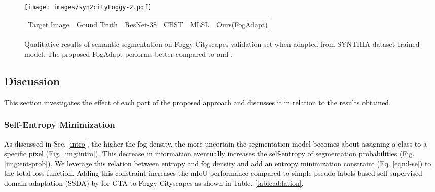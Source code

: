 \documentclass[final,5p,times,twocolumn]{elsarticle}
\begin{document}
\begin{figure*}[t]
	\centering
\texttt{[image: images/syn2cityFoggy-2.pdf]}\\
	\footnotesize
	\begin{tabular}{P{1.5cm}P{1.45cm}P{1.8cm}P{1.5cm}P{1.45cm}P{1.4cm}}
    Target Image & Gound Truth & ResNet-38 \cite{wu2019Resnet38} &CBST \cite{zou2018unsupervised} & MLSL \cite{mlsl2020} & Ours(FogAdapt)
    \end{tabular}
    \caption{Qualitative results of semantic segmentation on Foggy-Cityscapes validation set when adapted from SYNTHIA dataset trained model. The proposed FogAdapt performs better compared to \cite{zou2018unsupervised} and \cite{mlsl2020}.}
\label{img:syn2cityFoggy}
\end{figure*}
\subsection{Discussion}
\textcolor{black}{This section investigates the effect of each part of the proposed approach and discusses it in relation to the results obtained.}

\subsubsection{Self-Entropy Minimization}
\textcolor{black}{
As discussed in Sec. \ref{intro}, the higher the fog density, the more uncertain the segmentation model becomes about assigning a class to a specific pixel (Fig. \ref{img:intro}). This decrease in information eventually increases the self-entropy of segmentation probabilities (Fig. \ref{img:ent-prob}). \textcolor{black}{We leverage this relation between entropy and fog density and add an entropy minimization constraint (Eq. \ref{eqn:l-se}) to the total loss function}. Adding this constraint increases the mIoU performance compared to simple pseudo-labels based self-supervised domain adaptation (SSDA) by  for GTA to Foggy-Cityscapes as shown in Table. \ref{table:ablation}. 
}

\begin{table}[H]
\footnotesize
\centering
\caption{Effect of self-entropy and scale invariance. SSDA: Self-supervised domain adaptation. Here SE is Self-entropy while SI is Scale Invariance.}
\label{table:ablation}
\end{table}
\end{document}
